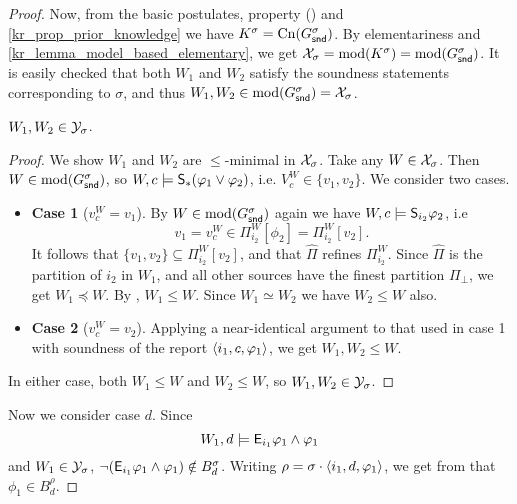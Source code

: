 \begin{proof}
    Now, from the basic postulates, property
    () and
    \cref{kr_prop_prior_knowledge} we have $K^\sigma = \cn(G^\sigma_\snd)$. By
    elementariness and \cref{kr_lemma_model_based_elementary}, we get
    $\X_\sigma = \mods(K^\sigma) = \mods(G^\sigma_\snd)$. It is easily checked
    that both $W_1$ and $W_2$ satisfy the soundness statements corresponding to
    $\sigma$, and thus $W_1, W_2 \in \mods(G^\sigma_\snd) = \X_\sigma$.

        \begin{claim}
            \label{kr_claim_w1_w2_in_ysigm}
            $W_1, W_2 \in \Y_\sigma$.
        \end{claim}
        \begin{proof}
            We show $W_1$ and $W_2$ are $\le$-minimal in $\X_\sigma$. Take any
            $W \in \X_\sigma$. Then $W \in \mods(G^\sigma_\snd)$, so $W, c
            \models \S_\ast(\phi_1 \lor \phi_2)$, i.e. $V^W_c \in \{v_1, v_2\}$.
            We consider two cases.
            \begin{itemize}
                \item \textbf{Case 1} ($v^W_c = v_1$). By $W \in
                    \mods(G^\sigma_\snd)$ again we have $W, c \models
                    \S_{i_2}{\phi_2}$, i.e
                    \[
                        v_1
                        = v^W_c
                        \in \Pi^W_{i_2}[\phi_2]
                        = \Pi^W_{i_2}[v_2].
                    \]
                    It follows that $\{v_1, v_2\} \subseteq \Pi^W_{i_2}[v_2]$,
                    and that $\widehat{\Pi}$ refines $\Pi^W_{i_2}$. Since
                    $\widehat{\Pi}$ is the partition of $i_2$ in $W_1$, and all
                    other sources have the finest partition $\Pi_\bot$, we get
                    $W_1 \preceq W$. By , $W_1 \le W$. Since $W_1
                    \simeq W_2$ we have $W_2 \le W$ also.

                \item \textbf{Case 2} ($v^W_c = v_2$). Applying a near-identical
                      argument to that used in case 1 with soundness of the
                      report $\tuple{i_1, c, \phi_1}$, we get $W_1, W_2 \le W$.
            \end{itemize}
            In either case, both $W_1 \le W$ and $W_2 \le W$, so $W_1, W_2 \in
            \Y_\sigma$.
        \end{proof}

    Now we consider case $d$. Since
    \[
        W_1, d \models \E_{i_1}{\phi_1} \land \phi_1
    \]
    and $W_1 \in \Y_\sigma$, $\neg(\E_{i_1}{\phi_1} \land \phi_1) \notin
    B^\sigma_d$. Writing $\rho = \sigma \concat \tuple{i_1, d, \phi_1}$, we get
    from \strongcondsucc{} that $\phi_1 \in B^\rho_d$.


\end{proof}

